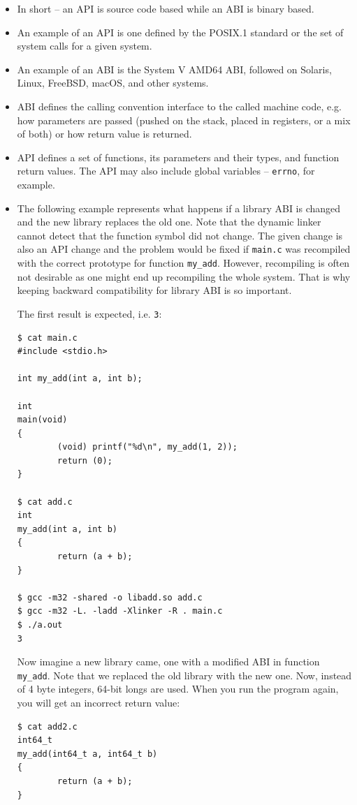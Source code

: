 \begin{itemize}
\item In short -- an API is source code based while an ABI is binary based.
\item An example of an API is one defined by the POSIX.1 standard or the set of
system calls for a given system.
\item An example of an ABI is the System V AMD64 ABI, followed on Solaris,
Linux, FreeBSD, macOS, and other systems.
\item ABI defines the calling convention interface to the called machine code, e.g.
how parameters are passed (pushed on the stack, placed in registers, or a mix
of both) or how return value is returned.
\item API defines a set of functions, its parameters and their types, and
function return values.  The API may also include global variables --
\texttt{errno}, for example.
\item The following example represents what happens if a library ABI is changed
and the new library replaces the old one.  Note that the dynamic linker cannot
detect that the function symbol did not change.  The given change is also an
API change and the problem would be fixed if \texttt{main.c} was recompiled
with the correct prototype for function \texttt{my\_add}.  However,
recompiling is often not desirable as one might end up recompiling the whole
system.  That is why keeping backward compatibility for library ABI is so
important.

The first result is expected, i.e. \texttt{3}:

\begin{verbatim}
$ cat main.c
#include <stdio.h>

int my_add(int a, int b);

int
main(void)
{
        (void) printf("%d\n", my_add(1, 2));
        return (0);
}

$ cat add.c
int
my_add(int a, int b)
{
        return (a + b);
}

$ gcc -m32 -shared -o libadd.so add.c
$ gcc -m32 -L. -ladd -Xlinker -R . main.c
$ ./a.out
3
\end{verbatim}

Now imagine a new library came, one with a modified ABI in function
\texttt{my\_add}.  Note that we replaced the old library with the new one.
Now, instead of 4 byte integers, 64-bit longs are used.  When you run the
program again, you will get an incorrect return value:

\begin{verbatim}
$ cat add2.c
int64_t
my_add(int64_t a, int64_t b)
{
        return (a + b);
}


\end{verbatim}
\end{itemize}
